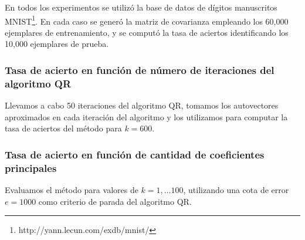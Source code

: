 \documentclass[a4paper,10pt,twoside]{article}
\begin{document}
En todos los experimentos se utilizó la base de datos de dígitos manuscritos MNIST\footnote{http://yann.lecun.com/exdb/mnist/}. En cada caso se generó la matriz de covarianza empleando los 60,000 ejemplares de entrenamiento, y se computó la tasa de aciertos identificando los 10,000 ejemplares de prueba.


\subsubsection{Tasa de acierto en función de número de iteraciones del algoritmo QR}

Llevamos a cabo 50 iteraciones del algoritmo QR, tomamos los autovectores aproximados en cada iteración del algoritmo y los utilizamos para computar la tasa de aciertos del método para $k = 600$.


\subsubsection{Tasa de acierto en función de cantidad de coeficientes principales}

Evaluamos el método para valores de $k = 1, \ldots 100$, utilizando una cota de error $e = 1000$ como criterio de parada del algoritmo QR.






\end{document}
